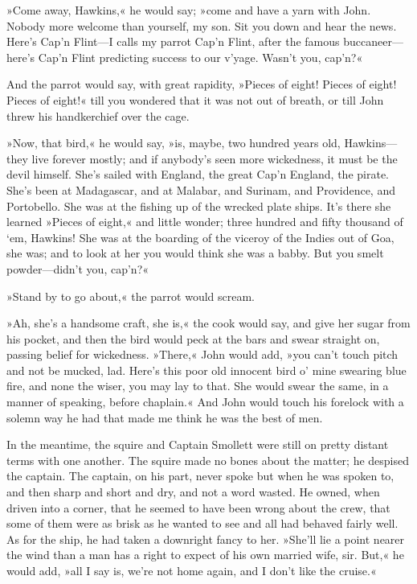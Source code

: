 »Come away, Hawkins,« he would say; »come and have a yarn with John. Nobody more welcome than yourself, my son. Sit you down and hear the news. Here's Cap'n Flint—I calls my parrot Cap'n Flint, after the famous buccaneer—here's Cap'n Flint predicting success to our v'yage. Wasn't you, cap'n?«

And the parrot would say, with great rapidity, »Pieces of eight! Pieces of eight! Pieces of eight!« till you wondered that it was not out of breath, or till John threw his handkerchief over the cage.

»Now, that bird,« he would say, »is, maybe, two hundred years old, Hawkins—they live forever mostly; and if anybody's seen more wickedness, it must be the devil himself. She's sailed with England, the great Cap'n England, the pirate. She's been at Madagascar, and at Malabar, and Surinam, and Providence, and Portobello. She was at the fishing up of the wrecked plate ships. It's there she learned »Pieces of eight,« and little wonder; three hundred and fifty thousand of `em, Hawkins! She was at the boarding of the viceroy of the Indies out of Goa, she was; and to look at her you would think she was a babby. But you smelt powder—didn't you, cap'n?«

»Stand by to go about,« the parrot would scream.

»Ah, she's a handsome craft, she is,« the cook would say, and give her sugar from his pocket, and then the bird would peck at the bars and swear straight on, passing belief for wickedness. »There,« John would add, »you can't touch pitch and not be mucked, lad. Here's this poor old innocent bird o' mine swearing blue fire, and none the wiser, you may lay to that. She would swear the same, in a manner of speaking, before chaplain.« And John would touch his forelock with a solemn way he had that made me think he was the best of men.

In the meantime, the squire and Captain Smollett were still on pretty distant terms with one another. The squire made no bones about the matter; he despised the captain. The captain, on his part, never spoke but when he was spoken to, and then sharp and short and dry, and not a word wasted. He owned, when driven into a corner, that he seemed to have been wrong about the crew, that some of them were as brisk as he wanted to see and all had behaved fairly well. As for the ship, he had taken a downright fancy to her. »She'll lie a point nearer the wind than a man has a right to expect of his own married wife, sir. But,« he would add, »all I say is, we're not home again, and I don't like the cruise.«

